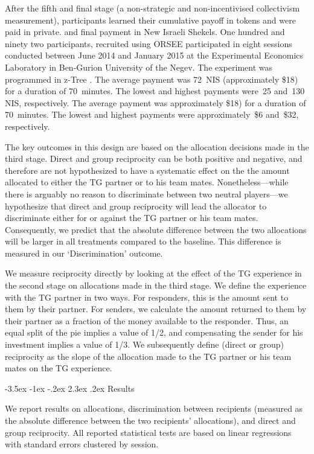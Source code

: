 \documentclass[12pt,a4paper]{article}\usepackage[]{graphicx}\usepackage[]{color}
\makeatletter
\renewcommand\section{\@startsection {section}{1}{\z@}%
{-3.5ex \@plus -1ex \@minus -.2ex}%
{2.3ex \@plus.2ex}%
{\bf\sffamily\Large}}
\makeatother
\begin{document}
After the fifth and final stage (a non-strategic and non-incentivised
collectivism measurement), participants learned their cumulative payoff in tokens and were paid in private.
and final payment in New Israeli Shekels.
One hundred and ninety two participants, recruited using ORSEE \citep*{greiner2015subject} participated in eight sessions conducted between June 2014 and January
2015 at the Experimental Economics Laboratory in Ben-Gurion University of the Negev.
The experiment was programmed in z-Tree \citep*{Fischbacher2007}.
The average payment was 72~NIS (approximately \$18) for a duration of 70~minutes. The lowest and highest payments were~25 and~130 NIS, respectively.
The average payment was approximately \$18) for a duration of 70~minutes. The lowest and highest payments were approximately~\$6 and~\$32, respectively.

The key outcomes in this design are based on the allocation decisions made in the third stage. Direct and group reciprocity can be both positive and negative, and therefore are not hypothesized to have a systematic effect on the the amount allocated to either the TG partner or to his team mates. Nonetheless---while there is arguably no reason to discriminate between two neutral players---we hypothesize that direct and group reciprocity will lead the allocator to discriminate either for or against the TG partner or his team mates. Consequently, we predict that the absolute difference between the two allocations will be larger in all treatments compared to the baseline. This difference is measured in our `Discrimination' outcome.

We measure reciprocity directly by looking at the effect of the TG experience in the second stage on allocations made in the third stage. We define the experience with the TG partner in two ways. For responders, this is the amount sent to them by their partner. For senders, we calculate the amount returned to them by their partner as a fraction of the money available to the responder. Thus, an equal split of the pie implies a value of 1/2, and compensating the sender for his investment implies a value of 1/3. We subsequently define (direct or group) reciprocity as the slope of the allocation made to the TG partner or his team mates on the TG experience.

\section{Results}
\label{sec:results}

We report results on allocations, discrimination between recipients (measured as the
absolute difference between the two recipients' allocations), and direct and
group reciprocity. All reported statistical tests are based on linear
regressions with standard errors clustered by session. 
\end{document}
